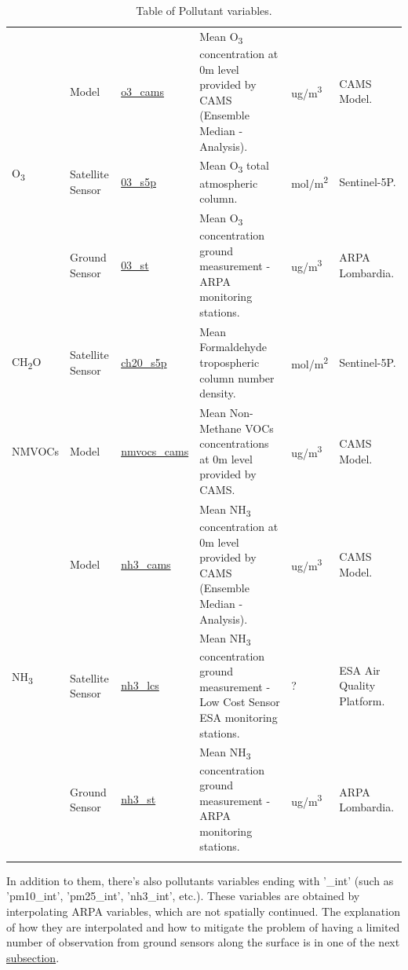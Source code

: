 \begin{center}
\begin{longtable}{ |p{2cm}|p{1.5cm}|p{2.3cm}|p{4cm}|p{1cm}|p{2cm}| }
\multirow{3}{4em}{O\textsubscript{3}} & Model  & \underline{o3\_cams} & Mean O\textsubscript{3} concentration at 0m level provided by CAMS  (Ensemble Median - Analysis).\par & ug/m\textsuperscript{3} & CAMS Model.\\ 
& Satellite \newline Sensor  & \underline{03\_s5p} &  Mean O\textsubscript{3} total atmospheric column.\par  & mol/m\textsuperscript{2} & Sentinel-5P.\\ 
& Ground \newline Sensor & \underline{03\_st} &  Mean O\textsubscript{3} concentration ground measurement - ARPA monitoring stations.  \par& ug/m\textsuperscript{3} & ARPA \newline Lombardia.\\ 
 \hline
 
 \multirow{1}{4em}{CH\textsubscript{2}O}& Satellite \newline Sensor  & \underline{ch20\_s5p} &  Mean Formaldehyde tropospheric column number density. \par & mol/m\textsuperscript{2} & Sentinel-5P.\\ \hline
 
\multirow{1}{4em}{NMVOCs}& Model  & \underline{nmvocs\_cams} & Mean Non-Methane VOCs concentrations at 0m level provided by CAMS.\par & ug/m\textsuperscript{3} & CAMS Model.\\ \hline

\multirow{3}{4em}{NH\textsubscript{3}} & Model  & \underline{nh3\_cams} & Mean NH\textsubscript{3} concentration at 0m level provided by CAMS  (Ensemble Median - Analysis).\par & ug/m\textsuperscript{3} & CAMS Model.\\ 
& Satellite \newline Sensor  & \underline{nh3\_lcs} &  Mean NH\textsubscript{3} concentration ground measurement - Low Cost Sensor ESA monitoring stations. \par  & ? & ESA Air Quality Platform.\\ 
& Ground \newline Sensor & \underline{nh3\_st} &  Mean NH\textsubscript{3} concentration ground measurement - ARPA monitoring stations. \par & ug/m\textsuperscript{3} & ARPA \newline Lombardia.\\ \hline
\caption{Table of Pollutant variables.}
\end{longtable}
\end{center}
In addition to them, there's also pollutants variables ending with '\_int' (such as 'pm10\_int', 'pm25\_int', 'nh3\_int', etc.). These variables are obtained by interpolating ARPA variables, which are not spatially continued. The explanation of how they are interpolated and how to mitigate the problem of having a limited number of observation from ground sensors along the surface is in one of the next \hyperref[subsec:nan]{subsection}.
